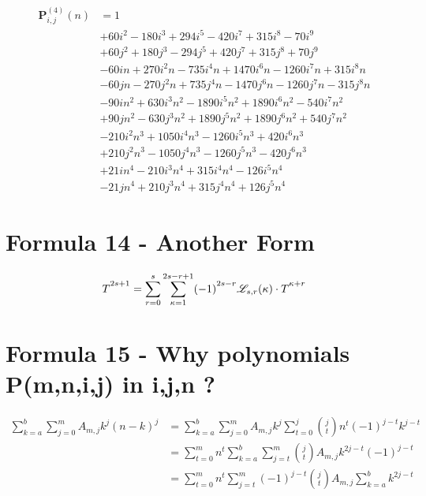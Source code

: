 \documentclass[12pt, letterpaper]{amsart}
\theoremstyle{definition}
\theoremstyle{remark}
\numberwithin{equation}{section}
\begin{document}
\begin{equation*}
\begin{split}
\mathbf{P}^{(4)}_{i,j}(n)
&=1 \\
&+60 i^2 - 180 i^3 + 294 i^5 - 420 i^7 + 315 i^8 - 70 i^9 \\
&+60 j^2 + 180 j^3 - 294 j^5 + 420 j^7 + 315 j^8 + 70 j^9 \\
&-60 i n +270 i^2 n - 735 i^4 n + 1470 i^6 n - 1260 i^7 n + 315 i^8 n \\
&-60 j n - 270 j^2 n + 735 j^4 n - 1470 j^6 n - 1260 j^7 n -315 j^8 n \\
&-90 i n^2 + 630 i^3 n^2 - 1890 i^5 n^2 + 1890 i^6 n^2 -540 i^7 n^2 \\
&+90 j n^2 - 630 j^3 n^2 + 1890 j^5 n^2 + 1890 j^6 n^2 +540 j^7 n^2 \\
&-210 i^2 n^3 + 1050 i^4 n^3 - 1260 i^5 n^3 +420 i^6 n^3 \\
&+210 j^2 n^3 - 1050 j^4 n^3 - 1260 j^5 n^3 -420 j^6 n^3 \\
&+21 i n^4 - 210 i^3 n^4 + 315 i^4 n^4 - 126 i^5 n^4 \\
&-21 j n^4 + 210 j^3 n^4 + 315 j^4 n^4 + 126 j^5 n^4
\end{split}
\end{equation*}
\section{Formula 14 - Another Form}
\begin{equation*}
T\strut^{2s+1}=\sum_{r=0}^{s}\sum_{\kappa=1}^{2s-r+1} (-1)\strut^{2s-r} \mathscr{L}_{s,r}(\kappa) \cdot T\strut^{\kappa+r}
\end{equation*}
\section{Formula 15 - Why polynomials P(m,n,i,j) in i,j,n ?}
\begin{equation*}
\begin{split}
\sum_{k=a}^{b}\sum_{j=0}^m A_{m,j}k^j(n-k)^j
&=\sum_{k=a}^{b}\sum_{j=0}^m A_{m,j}k^j\sum_{t=0}^j\binom{j}{t}n^t(-1)^{j-t}k^{j-t}\\
&=\sum_{t=0}^m n^t \sum_{k=a}^{b}\sum_{j=t}^m \binom{j}{t}A_{m,j}k^{2j-t}(-1)^{j-t}\\
&=\sum_{t=0}^m n^t \sum_{j=t}^m (-1)^{j-t}\binom{j}{t}A_{m,j}\sum_{k=a}^{b}k^{2j-t}
\end{split}
\end{equation*}
\end{document}
